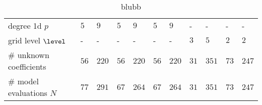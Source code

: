 \begin{table}[!ht]
\begin{tabularx}{\textwidth}{XXXXXXXXXXXX}
    \multicolumn{2}{l}{degree 1d $p$} &
    \multicolumn{1}{l}{$5$} &
    \multicolumn{1}{l}{$9$} &
    \multicolumn{1}{l}{$5$} &
    \multicolumn{1}{l}{$9$} &
    \multicolumn{1}{l}{$5$} &
    \multicolumn{1}{l}{$9$} &
    \multicolumn{1}{l}{-} &
    \multicolumn{1}{l}{-} &
    \multicolumn{1}{l}{-} &
    \multicolumn{1}{l}{-} \\
    \multicolumn{2}{l}{grid level $\level$} &
    \multicolumn{1}{l}{-} &
    \multicolumn{1}{l}{-} &
    \multicolumn{1}{l}{-} &
    \multicolumn{1}{l}{-} &
    \multicolumn{1}{l}{-} &
    \multicolumn{1}{l}{-} &
    \multicolumn{1}{l}{$3$} &
    \multicolumn{1}{l}{$5$} &
    \multicolumn{1}{l}{$2$} &
    \multicolumn{1}{l}{$2$} \\
    \multicolumn{2}{l}{\# unknown coefficients} &
    \multicolumn{1}{l}{$56$} &
    \multicolumn{1}{l}{$220$} &
    \multicolumn{1}{l}{$56$} &
    \multicolumn{1}{l}{$220$} &
    \multicolumn{1}{l}{$56$} &
    \multicolumn{1}{l}{$220$} &
    \multicolumn{1}{l}{$31$} &
    \multicolumn{1}{l}{$351$} &
    \multicolumn{1}{l}{$73$} &
    \multicolumn{1}{l}{$247$} \\
    \multicolumn{2}{l}{\# model evaluations $N$} &
    \multicolumn{1}{l}{$77$} &
    \multicolumn{1}{l}{$291$} &
    \multicolumn{1}{l}{$67$} &
    \multicolumn{1}{l}{$264$} &
    \multicolumn{1}{l}{$67$} &
    \multicolumn{1}{l}{$264$} &
    \multicolumn{1}{l}{$31$} &
    \multicolumn{1}{l}{$351$} &
    \multicolumn{1}{l}{$73$} &
    \multicolumn{1}{l}{$247$} \\

    \bottomrule
  \end{tabularx}
  \caption{blubb}
  \label{tab::ishigami-anova}
\end{table}
